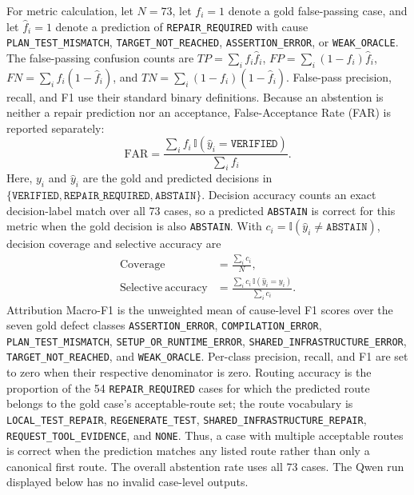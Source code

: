 \documentclass[pdflatex,sn-basic,Numbered,iicol]{sn-jnl}
\begin{document}
For metric calculation, let $N=73$, let $f_i=1$ denote a gold false-passing case, and let $\hat{f}_i=1$ denote a prediction of \texttt{REPAIR\_REQUIRED} with cause \texttt{PLAN\_TEST\_MISMATCH}, \texttt{TARGET\_NOT\_REACHED}, \texttt{ASSERTION\_ERROR}, or \texttt{WEAK\_ORACLE}. The false-passing confusion counts are $TP=\sum_i f_i\hat{f}_i$, $FP=\sum_i(1-f_i)\hat{f}_i$, $FN=\sum_i f_i(1-\hat{f}_i)$, and $TN=\sum_i(1-f_i)(1-\hat{f}_i)$. False-pass precision, recall, and F1 use their standard binary definitions. Because an abstention is neither a repair prediction nor an acceptance, False-Acceptance Rate (FAR) is reported separately:
\begin{equation}
\mathrm{FAR}=\frac{\sum_i f_i\,\mathbb{I}(\hat{y}_i=\texttt{VERIFIED})}{\sum_i f_i}.
\label{eq:rq3-far}
\end{equation}
Here, $y_i$ and $\hat{y}_i$ are the gold and predicted decisions in $\{\texttt{VERIFIED},\texttt{REPAIR\_REQUIRED},\texttt{ABSTAIN}\}$. Decision accuracy counts an exact decision-label match over all 73 cases, so a predicted \texttt{ABSTAIN} is correct for this metric when the gold decision is also \texttt{ABSTAIN}. With $c_i=\mathbb{I}(\hat{y}_i\neq\texttt{ABSTAIN})$, decision coverage and selective accuracy are
\begin{equation}
\begin{aligned}
\mathrm{Coverage} &= \frac{\sum_i c_i}{N},\\
\mathrm{Selective\ accuracy} &= \frac{\sum_i c_i\,\mathbb{I}(\hat{y}_i=y_i)}{\sum_i c_i}.
\end{aligned}
\label{eq:rq3-selective}
\end{equation}
Attribution Macro-F1 is the unweighted mean of cause-level F1 scores over the seven gold defect classes \texttt{ASSERTION\_ERROR}, \texttt{COMPILATION\_ERROR}, \texttt{PLAN\_TEST\_MISMATCH}, \texttt{SETUP\_OR\_RUNTIME\_ERROR}, \texttt{SHARED\_INFRASTRUCTURE\_ERROR}, \texttt{TARGET\_NOT\_REACHED}, and \texttt{WEAK\_ORACLE}. Per-class precision, recall, and F1 are set to zero when their respective denominator is zero. Routing accuracy is the proportion of the 54 \texttt{REPAIR\_REQUIRED} cases for which the predicted route belongs to the gold case's acceptable-route set; the route vocabulary is \texttt{LOCAL\_TEST\_REPAIR}, \texttt{REGENERATE\_TEST}, \texttt{SHARED\_INFRASTRUCTURE\_REPAIR}, \texttt{REQUEST\_TOOL\_EVIDENCE}, and \texttt{NONE}. Thus, a case with multiple acceptable routes is correct when the prediction matches any listed route rather than only a canonical first route. The overall abstention rate uses all 73 cases. The Qwen run displayed below has no invalid case-level outputs.
\end{document}
